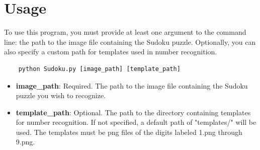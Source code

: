 \documentclass[12pt]{article}
\begin{document}
\section{Usage}

To use this program, you must provide at least one argument to the command line: the path to the image file containing the Sudoku puzzle. Optionally, you can also specify a custom path for templates used in number recognition.

\begin{verbatim}
    python Sudoku.py [image_path] [template_path]
\end{verbatim}

\begin{itemize}
    \item \textbf{image\_path}: Required. The path to the image file containing the Sudoku puzzle you wish to recognize.
    \item \textbf{template\_path}: Optional. The path to the directory containing templates for number recognition. If not specified, a default path of "templates/" will be used. The templates must be png files of the digits labeled 1.png through 9.png.
\end{itemize}
\end{document}
